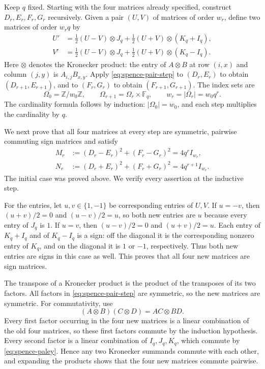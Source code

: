 \documentclass[10pt]{article}
\begin{document}
Keep $q$ fixed. Starting with the four matrices already specified,
construct $D_r,E_r,F_r,G_r$ recursively. Given a pair $(U,V)$ of matrices
of order $w_r$, define two matrices of order $w_rq$ by
\begin{equation}\label{eq:spence-pair-step}
 \begin{split}
 U'&=\tfrac12(U-V)\otimes J_q+
       \tfrac12(U+V)\otimes(K_q+I_q),\\
 V'&=\tfrac12(U-V)\otimes J_q+
       \tfrac12(U+V)\otimes(K_q-I_q).
 \end{split}
\end{equation}
Here $\otimes$ denotes the Kronecker product: the entry of $A\otimes B$
at row $(i,x)$ and column $(j,y)$ is $A_{i,j}B_{x,y}$.
Apply \eqref{eq:spence-pair-step} to $(D_r,E_r)$ to obtain
$(D_{r+1},E_{r+1})$, and to $(F_r,G_r)$ to obtain
$(F_{r+1},G_{r+1})$. The index sets are
\[
 \Omega_0=\mathbb Z/w_0\mathbb Z,\qquad
 \Omega_{r+1}=\Omega_r\times\mathbb F_q,
 \qquad w_r=|\Omega_r|=w_0q^r.
\]
The cardinality formula follows by induction: $|\Omega_0|=w_0$, and each
step multiplies the cardinality by $q$.

We next prove that all four matrices at every step are symmetric,
pairwise commuting sign matrices and satisfy
\begin{equation}\label{eq:spence-induction-norms}
 \begin{split}
 M_r&:=(D_r-E_r)^2+(F_r-G_r)^2=4q^rI_{w_r},\\
 N_r&:=(D_r+E_r)^2+(F_r+G_r)^2=4q^{r+1}I_{w_r}.
 \end{split}
\end{equation}
The initial case was proved above. We verify every assertion at the
inductive step.

For the entries, let $u,v\in\{1,-1\}$ be corresponding entries of $U,V$.
If $u=-v$, then $(u+v)/2=0$ and $(u-v)/2=u$, so both new entries are $u$
because every entry of $J_q$ is $1$. If $u=v$, then $(u-v)/2=0$ and
$(u+v)/2=u$. Each entry of $K_q+I_q$ and of $K_q-I_q$ is a sign: off
the diagonal it is the corresponding nonzero entry of $K_q$, and on the
diagonal it is $1$ or $-1$, respectively. Thus both new entries are signs
in this case as well. This proves that all four new matrices are sign
matrices.

The transpose of a Kronecker product is the product of the transposes of
its two factors. All factors in \eqref{eq:spence-pair-step} are symmetric,
so the new matrices are symmetric. For commutativity, use
\[
 (A\otimes B)(C\otimes D)=AC\otimes BD.
\]
Every first factor occurring in the four new matrices is a linear
combination of the old four matrices, so these first factors commute by
the induction hypothesis. Every second factor is a linear combination of
$I_q,J_q,K_q$, which commute by \eqref{eq:spence-paley}. Hence any two
Kronecker summands commute with each other, and expanding the products
shows that the four new matrices commute pairwise.
\end{document}
